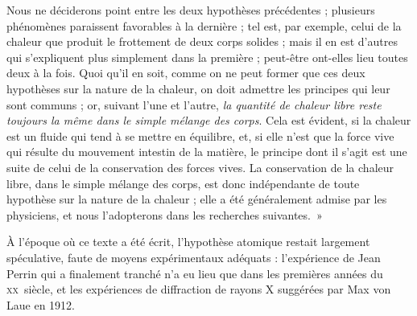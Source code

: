 	Nous ne déciderons point entre les deux hypothèses précédentes ; plusieurs phénomènes paraissent favorables à la dernière ; tel est, par exemple, celui de la chaleur que produit le frottement de deux corps solides ; mais il en est d’autres qui s’expliquent plus simplement dans la première ; peut-être ont-elles lieu toutes deux à la fois. Quoi qu’il en soit, comme on ne peut former que ces deux hypothèses sur la nature de la chaleur, on doit admettre les principes qui leur sont communs ; or, suivant l’une et l’autre, \emph{la quantité de chaleur libre reste toujours la même dans le simple mélange des corps}. Cela est évident, si la chaleur est un fluide qui tend à se mettre en équilibre, et, si elle n’est que la force vive qui résulte du mouvement intestin de la matière, le principe dont il s’agit est une suite de celui de la conservation des forces vives. La conservation de la chaleur libre, dans le simple mélange des corps, est donc indépendante de toute hypothèse sur la nature de la chaleur ; elle a été généralement admise par les physiciens, et nous l’adopterons dans les recherches suivantes.~» \onlyframabook{\end{quote}}\onlyamphibook{\end{historyquote}}

	À l'époque où ce texte a été écrit, l'hypothèse atomique restait largement spéculative, faute de moyens expérimentaux adéquats : l'expérience de Jean Perrin qui a finalement tranché n'a eu lieu que dans les premières années du \textsc{xx}\ieme\ siècle, et les expériences de diffraction de rayons X suggérées par Max von Laue en 1912.

\atendofhistorysection
